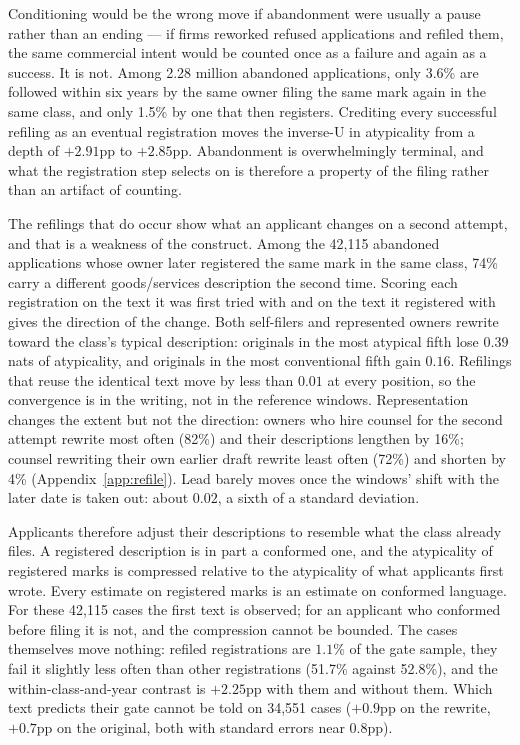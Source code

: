 Conditioning would be the wrong move if abandonment were usually a pause
rather than an ending --- if firms reworked refused applications and refiled
them, the same commercial intent would be counted once as a failure and again
as a success. It is not. Among 2.28 million abandoned applications, only
3.6\% are followed within six years by the same owner filing the same mark
again in the same class, and only 1.5\% by one that then registers. Crediting
every successful refiling as an eventual registration moves the inverse-U in
atypicality from a depth of $+2.91$pp to $+2.85$pp. Abandonment is
overwhelmingly terminal, and what the registration step selects on is
therefore a property of the filing rather than an artifact of counting.

The refilings that do occur show what an applicant changes on a second
attempt, and that is a weakness of the construct. Among the 42{,}115
abandoned applications whose owner later registered the same mark in the
same class, 74\% carry a different goods/services description the second
time. Scoring each registration on the text it was first tried with and on
the text it registered with gives the direction of the change. Both
self-filers and represented owners rewrite toward the class's typical
description: originals in the most atypical fifth lose $0.39$ nats of
atypicality, and originals in the most conventional fifth gain $0.16$.
Refilings that reuse the identical text move by less than $0.01$ at every
position, so the convergence is in the writing, not in the reference
windows. Representation changes the extent but not the direction: owners
who hire counsel for the second attempt rewrite most often (82\%) and their
descriptions lengthen by 16\%; counsel rewriting their own earlier draft
rewrite least often (72\%) and shorten by 4\%
(Appendix~\ref{app:refile}). Lead barely moves once the windows' shift
with the later date is taken out: about $0.02$, a sixth of a standard
deviation.

Applicants therefore adjust their descriptions to resemble what the class
already files. A registered description is in part a conformed one, and the
atypicality of registered marks is compressed relative to the atypicality of
what applicants first wrote. Every estimate on registered marks is an
estimate on conformed language. For these 42{,}115 cases the first text is
observed; for an applicant who conformed before filing it is not, and the
compression cannot be bounded. The cases themselves move nothing: refiled
registrations are $1.1$\% of the gate sample, they fail it slightly less
often than other registrations (51.7\% against 52.8\%), and the
within-class-and-year contrast is $+2.25$pp with them and without them.
Which text predicts their gate cannot be told on 34{,}551 cases ($+0.9$pp
on the rewrite, $+0.7$pp on the original, both with standard errors near
$0.8$pp).

